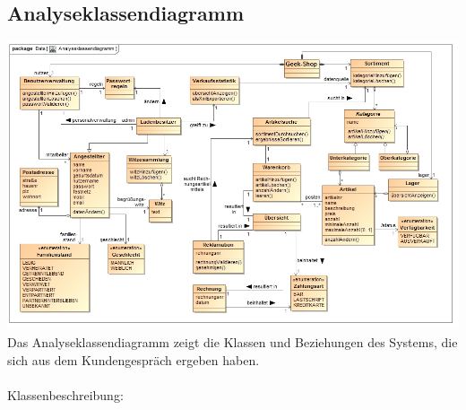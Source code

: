 \documentclass[pdftex,12pt,a4paper]{article}
\begin{document}
\subsection*{Analyseklassendiagramm}
\includegraphics[width=1\textwidth]{./images/analyseklassendiagramm}
Das Analyseklassendiagramm zeigt die Klassen und Beziehungen des Systems, die sich aus dem Kundengespr\"ach ergeben haben. \\\\
Klassenbeschreibung: \\
\end{document}
